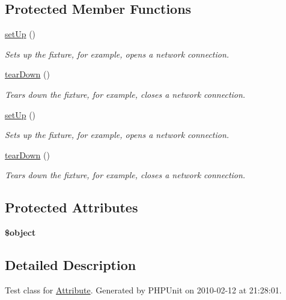 \subsection*{Protected Member Functions}
\begin{DoxyCompactItemize}
\item 
\hyperlink{class_attribute_test_aa03e8afdfdaee32dad2284fce3eb6b18}{setUp} ()
\begin{DoxyCompactList}\small\item\em Sets up the fixture, for example, opens a network connection. \item\end{DoxyCompactList}\item 
\hyperlink{class_attribute_test_a4b55e2f3fd1e0251f8abbd38ff560617}{tearDown} ()
\begin{DoxyCompactList}\small\item\em Tears down the fixture, for example, closes a network connection. \item\end{DoxyCompactList}\item 
\hyperlink{class_attribute_test_aa03e8afdfdaee32dad2284fce3eb6b18}{setUp} ()
\begin{DoxyCompactList}\small\item\em Sets up the fixture, for example, opens a network connection. \item\end{DoxyCompactList}\item 
\hyperlink{class_attribute_test_a4b55e2f3fd1e0251f8abbd38ff560617}{tearDown} ()
\begin{DoxyCompactList}\small\item\em Tears down the fixture, for example, closes a network connection. \item\end{DoxyCompactList}\end{DoxyCompactItemize}
\subsection*{Protected Attributes}
\begin{DoxyCompactItemize}
\item 
\hypertarget{class_attribute_test_a2a4773379a2b251d7053d40912addb6f}{
{\bfseries \$object}}
\label{class_attribute_test_a2a4773379a2b251d7053d40912addb6f}

\end{DoxyCompactItemize}


\subsection{Detailed Description}
Test class for \hyperlink{class_attribute}{Attribute}. Generated by PHPUnit on 2010-\/02-\/12 at 21:28:01.

